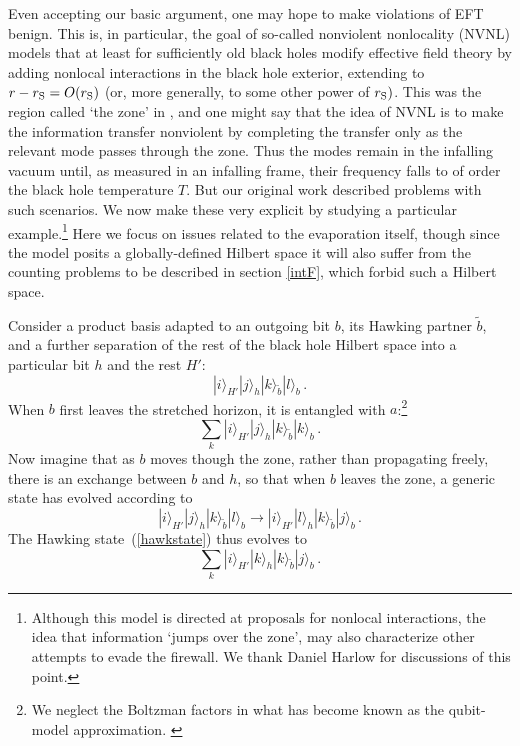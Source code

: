 \documentclass[12pt]{article}
\newcommand{\be}{\begin{equation}}
\newcommand{\ee}{\end{equation}}
\begin{document}
{Even accepting our basic argument, one may hope to make violations of EFT benign.  This is, in particular, the goal of so-called nonviolent nonlocality (NVNL) models \cite{Giddings:2011ks,Giddings:2012gc,Giddings:2013kcj} that {at least for sufficiently old black holes} modify effective field theory by adding nonlocal interactions in the black hole exterior, {extending to $r - r_{\rm S} = O(r_{\rm S})$ (or, more generally, to some other power of $r_{\rm S})$. This was the region called `the zone' in \cite{Bousso:2012as,Susskind:2012rm}, and one might say that the idea of NVNL is to make the information transfer nonviolent by completing the transfer only as the relevant mode passes through the zone. Thus the modes remain} in the infalling vacuum until, as measured in an infalling frame, their frequency falls to of order the black hole temperature $T$.   But our original work \cite{Almheiri:2012rt} described problems with such scenarios.  We now make these very explicit by studying a particular example.\footnote{{Although this model is directed at proposals for nonlocal interactions, the idea that information  `jumps over the zone',  may also characterize other attempts to evade the firewall.  We thank Daniel Harlow for discussions of this point.}} Here we focus on issues related to the evaporation itself, though since the model posits a globally-defined Hilbert space it will also suffer from the counting problems to be described in section \ref{intF}, which forbid such a Hilbert space.


Consider a product basis {adapted to} an outgoing bit $b$, its Hawking partner $\tilde b$, and {a further separation of} the rest of the black hole Hilbert space into a particular bit $h$ and the rest $H'$:
\be
|i\rangle_{H'} |j\rangle_{h} |k\rangle_{\tilde b} |l\rangle_{b} \,.
\ee
When $b$ first leaves the stretched horizon, it is entangled with $a$:\footnote{We neglect the Boltzman factors in what has become known as the qubit-model approximation. \label{qubit}}
\be
\sum_k  |i\rangle_{H'} |j\rangle_{h} |k\rangle_{\tilde b} |k\rangle_{b} \,. \label{hawkstate}
\ee
Now imagine that as $b$ moves though the {zone}, rather than propagating freely, there is an exchange between $b$ and $h$, so that when $b$ leaves the {zone}, a generic state has evolved according to
\be
\label{ti}
|i\rangle_{H'} |j\rangle_{h} |k\rangle_{\tilde b} |l\rangle_{b}
\to
|i\rangle_{H'} |l\rangle_{h} |k\rangle_{\tilde b} |j\rangle_{b} \,.
\ee
The Hawking state~(\ref{hawkstate}) thus evolves to
\be
\sum_k  |i\rangle_{H'} |k\rangle_{h} |k\rangle_{\tilde b} |j\rangle_{b} \,. \label{leavezone}
\ee

}
\end{document}
